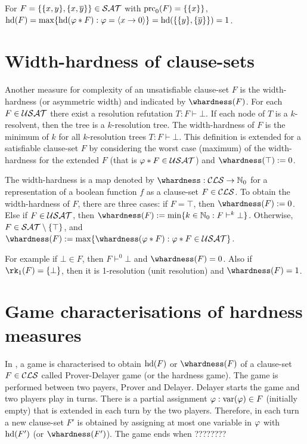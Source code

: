 \documentclass[]{book}
\begin{document}
\begin{examp}\label{exp:hd-extd}
For $F = \{ \{ x, y \} , \{ x,\overline y \} \} \in \mathcal{SAT}$ with $\operatorname{prc}_0(F) = \{ \{ x \} \}$,  $\operatorname{hd}(F)= \max \{  \operatorname{hd}(\varphi * F) : \varphi =\langle x \rightarrow 0 \rangle  \}=\operatorname{hd}(\{ \{ y \},\{ \overline y \} \})=1$.
\end{examp}

\section{Width-hardness of clause-sets}
\label{sec:whdd}

Another measure for complexity of an unsatisfiable clause-set $F$ is the width-hardness (or asymmetric width) and indicated by $\whardness(F)$. For each $F \in \mathcal{USAT}$ there exist a resolution refutation $T:F \vdash \bot$. If each node of $T$ is a $k$-resolvent, then the tree is a $k$-resolution tree. The width-hardness of $F$ is the minimum of $k$ for all $k$-resolution trees $T:F \vdash \bot$. This definition is extended for a satisfiable clause-set $F$ by considering the worst case (maximum) of the width-hardness for the extended $F$ (that is $ \varphi * F \in \mathcal{USAT}$) and $\whardness(\top):=0$.

\begin{defi}\label{def:whd-extended}
The width-hardness is a map denoted by $\whardness : \Cls \rightarrow \NNZ$ for a representation of a boolean function $f$ as a clause-set $F \in \mathcal{CLS}$. To obtain the width-hardness of  $F$, there are three cases: if $F = \top$, then $\whardness(F) := 0$. Else if $F \in \mathcal{USAT}$, then $\whardness(F) := \min \set{k \in \NNZ : F \vdash^k \bot}$. Otherwise, $F \in \mathcal{SAT} \setminus \{ \top \}$, and $\whardness(F) := \max \set{ \whardness(\vp * F) : \vp * F \in \Usat }$.
\end{defi}

For example if $\bot \in F$, then $F \vdash^0 \bot$ and $\whardness(F)=0$. Also if $\rk_1(F)=\set{\bot}$, then it is 1-resolution (unit resolution) and  $\whardness(F)=1$.

\section{Game characterisations of hardness measures}
\label{sec:game-pd}

In \cite{h18}, a game is characterised to obtain $\operatorname{hd}(F)$ or $\whardness(F)$ of a clause-set $F \in \mathcal{CLS}$ called Prover-Delayer game (or the hardness game). The game is performed between two payers, Prover and Delayer. Delayer starts the game and two players play in turns. There is a partial assignment $\varphi: \operatorname{var}(\varphi) \in F$ (initially empty) that is extended in each turn by the two players. Therefore, in each turn a new clause-set $F'$ is obtained by assigning at most one variable in $\varphi$ with $\operatorname{hd}(F')$ (or $\whardness(F')$). The game ends when ????????
\end{document}
